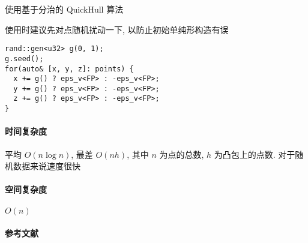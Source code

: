 使用基于分治的 QuickHull 算法

使用时建议先对点随机扰动一下, 以防止初始单纯形构造有误

\begin{verbatim}
rand::gen<u32> g(0, 1);
g.seed();
for(auto& [x, y, z]: points) {
  x += g() ? eps_v<FP> : -eps_v<FP>;
  y += g() ? eps_v<FP> : -eps_v<FP>;
  z += g() ? eps_v<FP> : -eps_v<FP>;
}
\end{verbatim}

\paragraph{时间复杂度} 平均 \(O(n\log n)\), 最差 \(O(nh)\), 其中 \(n\) 为点的总数, \(h\) 为凸包上的点数. 对于随机数据来说速度很快

\paragraph{空间复杂度} \(O(n)\)

\paragraph{参考文献} \cite{barber1996quickhull}